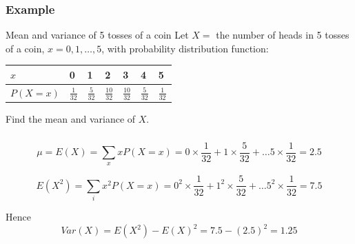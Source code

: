 \documentclass[t,xcolor=pdftex,dvipsnames,table]{beamer}\usepackage[]{graphicx}\usepackage[]{color}
\begin{document}
\begin{frame}\frametitle{Example}
\begin{block}{Mean and variance of 5 tosses of a coin}
Let $X = $ the number of heads in 5 tosses of a coin, $x=0,1,\ldots,5$, with probability distribution function:

\begin{center}
\begin{tabular}{|l|l|l|l|l|l|l|} \hline
$x$ & 0 & 1 & 2 & 3 & 4 & 5  \\ \hline
$P(X=x)$ & $\frac{1}{32}$ & $\frac{5}{32}$ & $\frac{10}{32}$ & $\frac{10}{32}$ & $\frac{5}{32}$ & $\frac{1}{32}$  \\ \hline
\end{tabular}
\end{center}

Find the mean and variance of $X$.
\end{block}
\end{frame}

\begin{frame}\frametitle{}
\begin{alertblock}{}

\[ \mu = E(X) = \sum_{x} x P(X=x) = 0 \times \frac{1}{32} + 1 \times \frac{5}{32} + \ldots  5 \times \frac{1}{32} = 2.5 \]

\[ E(X^2) = \sum_{i} x^2 P(X=x) = 0^2 \times \frac{1}{32} + 1^2 \times \frac{5}{32} + \ldots  5^2 \times \frac{1}{32} = 7.5 \]

Hence
\[ Var(X) = E(X^2) - E(X)^2 = 7.5 - (2.5)^2 = 1.25  \]

\end{alertblock}
\end{frame}
\end{document}
